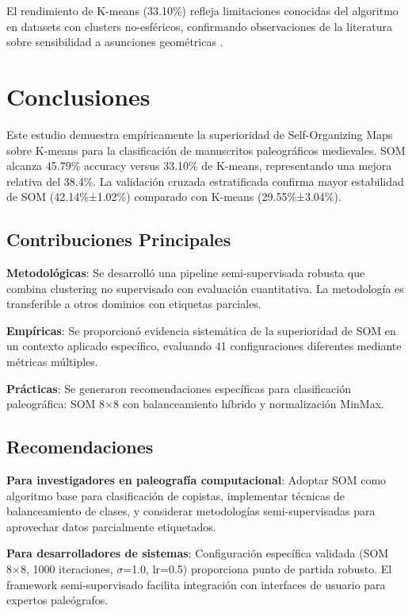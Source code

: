\documentclass[12pt,a4paper]{article}
\begin{document}
El rendimiento de K-means (33.10\%) refleja limitaciones conocidas del algoritmo en datasets con clusters no-esféricos, confirmando observaciones de la literatura sobre sensibilidad a asunciones geométricas \cite{jain2010}.

\section{Conclusiones}

Este estudio demuestra empíricamente la superioridad de Self-Organizing Maps sobre K-means para la clasificación de manuscritos paleográficos medievales. SOM alcanza 45.79\% accuracy versus 33.10\% de K-means, representando una mejora relativa del 38.4\%. La validación cruzada estratificada confirma mayor estabilidad de SOM (42.14\%±1.02\%) comparado con K-means (29.55\%±3.04\%).

\subsection{Contribuciones Principales}

\textbf{Metodológicas}: Se desarrolló una pipeline semi-supervisada robusta que combina clustering no supervisado con evaluación cuantitativa. La metodología es transferible a otros dominios con etiquetas parciales.

\textbf{Empíricas}: Se proporcionó evidencia sistemática de la superioridad de SOM en un contexto aplicado específico, evaluando 41 configuraciones diferentes mediante métricas múltiples.

\textbf{Prácticas}: Se generaron recomendaciones específicas para clasificación paleográfica: SOM 8×8 con balanceamiento híbrido y normalización MinMax.

\subsection{Recomendaciones}

\textbf{Para investigadores en paleografía computacional}: Adoptar SOM como algoritmo base para clasificación de copistas, implementar técnicas de balanceamiento de clases, y considerar metodologías semi-supervisadas para aprovechar datos parcialmente etiquetados.

\textbf{Para desarrolladores de sistemas}: Configuración específica validada (SOM 8×8, 1000 iteraciones, $\sigma$=1.0, lr=0.5) proporciona punto de partida robusto. El framework semi-supervisado facilita integración con interfaces de usuario para expertos paleógrafos.
\end{document}
